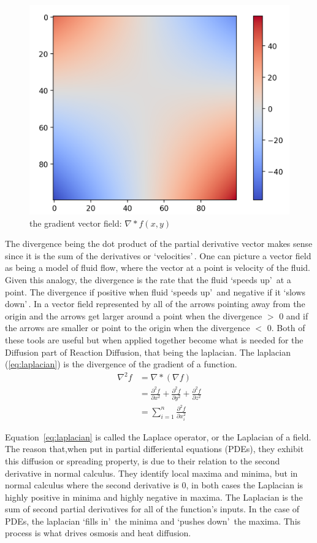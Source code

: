 \documentclass[12pt, letterpaper]{article}
\newcommand{\sorta}[1]{\lq #1\rq \,}
\begin{document}
\begin{figure}[!h]
  \centering  
  \label{fig:div}
  \includegraphics[width=.4\linewidth]{Basics/divergence}
  \caption{the gradient vector field: $\nabla * f(x,y)$}
\end{figure}

\newpage

The divergence being the dot product of the partial derivative vector makes sense since it is the sum of the
derivatives or \sorta{velocities}.
One can picture a vector field as being a model of fluid flow, where the vector at a point is 
velocity of the fluid. Given this analogy, the divergence is the rate that the fluid \sorta{speeds up} at a
point. The divergence if positive when fluid \sorta{speeds up} and negative if it \sorta{slows down}. In a
vector field represented by all of the arrows pointing away from the origin and the arrows get larger around
a point when the divergence $>$ 0 and if the arrows are smaller or point to the origin when the divergence
$<$ 0. Both of these tools are useful but when applied together become what is needed for the Diffusion part
of Reaction Diffusion, that being the laplacian. The laplacian (\ref{eq:laplacian}) is the divergence of the
gradient of a function.
\begin{equation}
  \label{eq:laplacian}
  \begin{split}
\nabla^2 f &= \nabla * (\nabla f) \\
           &= \frac{\partial^2 f}{\partial x^2} + \frac{\partial^2 f}{\partial y^2} + \frac{\partial^2
             f}{\partial z^2} \\
           &= \sum_{i=1}^{n} \frac{\partial^2 f}{\partial x_i^2}
\end{split}
\end{equation}

Equation~\ref{eq:laplacian} is called the Laplace operator, or the Laplacian of a field. The reason that,when
put in partial differiental equations
(PDEs), they exhibit this diffusion or spreading property, is due to their relation to the second derivative in
normal calculus. They identify local maxima and minima, but in normal calculus where the second derivative is
$0$, in both cases the Laplacian is highly positive in minima and highly negative in maxima. 
The Laplacian is the sum of second partial derivatives for all of the function's inputs. In the case 
of PDEs, the laplacian \sorta{fills in} the minima and \sorta{pushes down} the
maxima. This process is what drives osmosis and heat diffusion.
\end{document}
